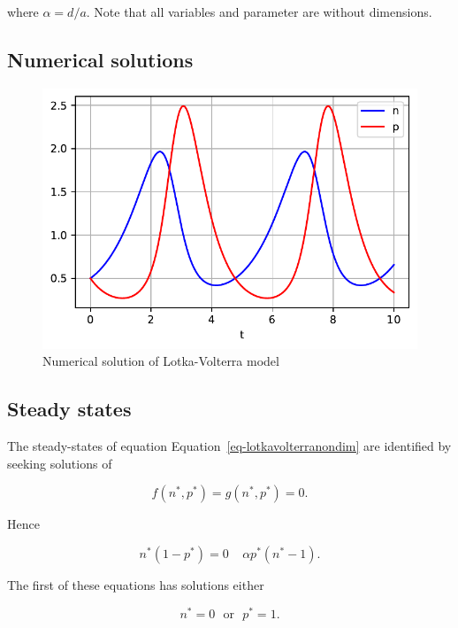 \documentclass[
  letterpaper,
  DIV=11,
  numbers=noendperiod]{scrreprt}
\begin{document}
where \(\alpha=d/a\). Note that all variables and parameter are without
dimensions.

\hypertarget{numerical-solutions-2}{%
\subsection{Numerical solutions}\label{numerical-solutions-2}}

\begin{figure}

{\centering \includegraphics{ContinuousTimeTwoSepcies_files/figure-pdf/fig-lv-numsol-output-1.pdf}

}

\caption{\label{fig-lv-numsol}Numerical solution of Lotka-Volterra
model}

\end{figure}

\hypertarget{steady-states-1}{%
\subsection{Steady states}\label{steady-states-1}}

The steady-states of equation Equation~\ref{eq-lotkavolterranondim} are
identified by seeking solutions of

\[
f(n^*,p^*)=g(n^*,p^*)=0.
\]

Hence

\[
n^*(1-p^*)= 0 \ \ \ \ \ \alpha p^*(n^*-1).
\]

The first of these equations has solutions either

\[
n^*=0 \ \ \  \textrm{or} \ \ \  p^* =1.
\]
\end{document}
